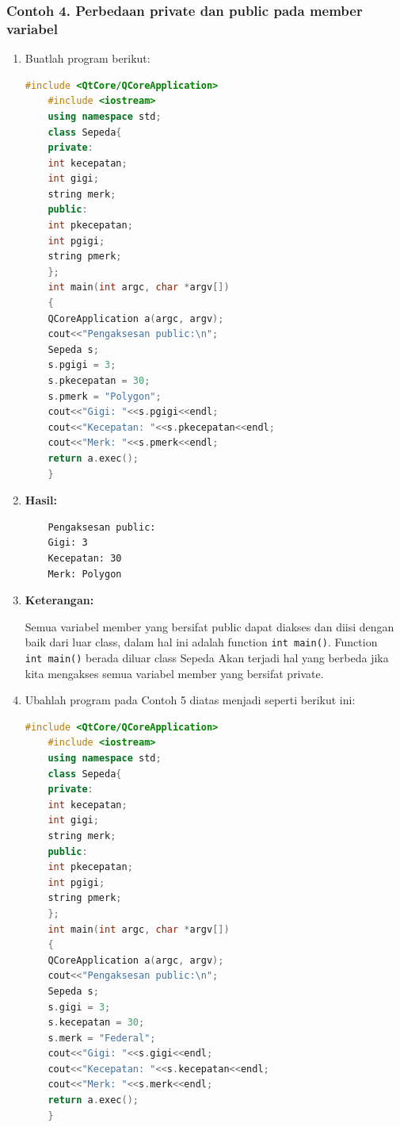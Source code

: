 \subsubsection*{Contoh 4. Perbedaan private dan public pada member variabel}
\begin{enumerate}
	\def\labelenumi{\arabic{enumi}.}
	\item Buatlah program berikut:
	\begin{lstlisting}[language=c++]
	#include <QtCore/QCoreApplication>
	#include <iostream>
	using namespace std;
	class Sepeda{
	private:
	int kecepatan;
	int gigi;
	string merk;
	public:
	int pkecepatan;
	int pgigi;
	string pmerk;
	};
	int main(int argc, char *argv[])
	{
	QCoreApplication a(argc, argv);
	cout<<"Pengaksesan public:\n";
	Sepeda s;
	s.pgigi = 3;
	s.pkecepatan = 30;
	s.pmerk = "Polygon";
	cout<<"Gigi: "<<s.pgigi<<endl;
	cout<<"Kecepatan: "<<s.pkecepatan<<endl;
	cout<<"Merk: "<<s.pmerk<<endl;
	return a.exec();
	}
	\end{lstlisting}
	
\item 	\textbf{Hasil:}
	
	\begin{verbatim}
	Pengaksesan public:
	Gigi: 3
	Kecepatan: 30
	Merk: Polygon
	\end{verbatim}
	
\item 	\textbf{Keterangan:}
	
	Semua variabel member yang bersifat public dapat diakses dan diisi
	dengan baik dari luar class, dalam hal ini adalah function
	\texttt{int\ main()}. Function \texttt{int\ main()} berada diluar class
	Sepeda Akan terjadi hal yang berbeda jika kita mengakses semua variabel
	member yang bersifat private.
	
\item 	Ubahlah program pada Contoh 5 diatas menjadi seperti berikut ini:
	
	\begin{lstlisting}[language=c++]
	#include <QtCore/QCoreApplication>
	#include <iostream>
	using namespace std;
	class Sepeda{
	private:
	int kecepatan;
	int gigi;
	string merk;
	public:
	int pkecepatan;
	int pgigi;
	string pmerk;
	};
	int main(int argc, char *argv[])
	{
	QCoreApplication a(argc, argv);
	cout<<"Pengaksesan public:\n";
	Sepeda s;
	s.gigi = 3;
	s.kecepatan = 30;
	s.merk = "Federal";
	cout<<"Gigi: "<<s.gigi<<endl;
	cout<<"Kecepatan: "<<s.kecepatan<<endl;
	cout<<"Merk: "<<s.merk<<endl;
	return a.exec();
	}
	\end{lstlisting}
	

\end{enumerate}
